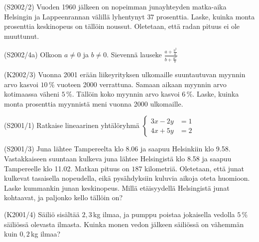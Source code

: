 \begin{tehtava}(S2002/2) Vuoden 1960 jälkeen on nopeimman junayhteyden matka-aika Helsingin ja Lappeenrannan välillä lyhentynyt $37$ prosenttia. Laske, kuinka monta prosenttia keskinopeus on tällöin noussut. Oletetaan, että radan pituus ei ole muuttunut.
\end{tehtava}

\begin{tehtava}(S2002/4a) Olkoon $ a \neq 0$ ja $b \neq 0 $. Sievennä lauseke
                        $
                            \frac{a + \frac{b^2}{a} } {b + \frac{a^2}{b} }
                        $
\end{tehtava}

\begin{tehtava}(K2002/3) Vuonna 2001 erään liikeyrityksen ulkomaille suuntautuvan myynnin arvo kasvoi $10$\,\% vuoteen 2000 verrattuna. Samaan aikaan myynnin arvo kotimaassa väheni $5$\,\%. Tällöin koko myynnin arvo kasvoi $6$\,\%. Laske, kuinka monta prosenttia myynnistä meni vuonna 2000 ulkomaille.
\end{tehtava}

\begin{tehtava}(S2001/1) Ratkaise lineaarinen yhtälöryhmä
                       $
                         \left\{
                          \begin{aligned}
                             3x - 2y &= 1 \\
                             4x + 5y &= 2                      
                         \end{aligned}
                         \right.
                       $
\end{tehtava}

\begin{tehtava}(S2001/3) Juna lähtee Tampereelta klo 8.06 ja saapuu Helsinkiin klo 9.58. Vastakkaiseen suuntaan kulkeva juna lähtee Helsingistä klo 8.58 ja saapuu Tampereelle klo 11.02. Matkan pituus on $187$ kilometriä. Oletetaan, että junat kulkevat tasaisella nopeudella, eikä pysähdyksiin kuluvia aikoja oteta huomioon. Laske kummankin junan keskinopeus. Millä etäisyydellä Helsingistä junat kohtaavat, ja paljonko kello tällöin on? 
\end{tehtava}

\begin{tehtava}(K2001/4) Säiliö sisältää $2,3$\,kg ilmaa, ja pumppu poistaa jokaisella vedolla $5$\,\% säiliössä olevasta ilmasta. Kuinka monen vedon jälkeen säiliössä on vähemmän kuin $0,2$\,kg ilmaa?
\end{tehtava}


